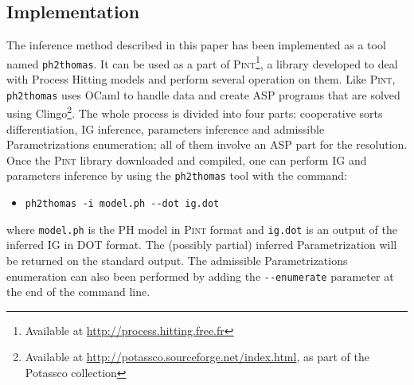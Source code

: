 \subsection{Implementation}
The inference method described in this paper has been implemented as a tool named \texttt{ph2thomas}. It can be used as a part of \textsc{Pint}\footnote{Available at \url{http://process.hitting.free.fr}}, a library developed to deal with Process Hitting models and perform several operation on them.
Like \textsc{Pint}, \texttt{ph2thomas} uses OCaml to handle data and create ASP programs that are solved using Clingo\footnote{Available at \url{http://potassco.sourceforge.net/index.html}, as part of the Potassco collection}.
The whole process is divided into four parts: cooperative sorts differentiation, IG inference, parameters inference and admissible Parametrizations enumeration; all of them involve an ASP part for the resolution.
Once the \textsc{Pint} library downloaded and compiled, one can perform IG and parameters inference by using the \texttt{ph2thomas} tool with the command:
\begin{itemize}
  \item[] \texttt{ph2thomas -i model.ph -{}-dot ig.dot}
\end{itemize}
where \texttt{model.ph} is the PH model in \textsc{Pint} format and \texttt{ig.dot} is an output of the inferred IG in DOT format.
The (possibly partial) inferred Parametrization will be returned on the standard output.
The admissible Parametrizations enumeration can also been performed by adding the \texttt{-{}-enumerate} parameter at the end of the command line.

